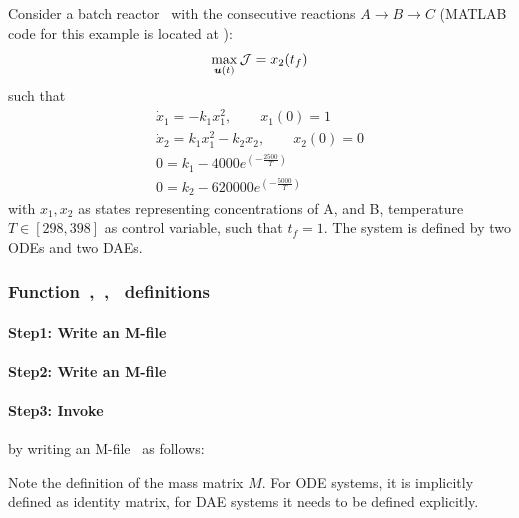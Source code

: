 Consider a batch reactor~\citep{raj01,dad95} with the 
consecutive reactions $A \rightarrow B\rightarrow C$ (MATLAB code for this example is located
at ):
\begin{equation}
\max_{\ve{u}(t)} \mf{J} = x_{2}(t_{f}) \label{eq:batch_dae}
\end{equation}
such that
\begin{gather}
\dot{x}_{1} = -k_{1}x_{1}^{2}, \qquad x_1(0) = 1 \\
\dot{x}_{2} = k_{1}x_{1}^{2} - k_{2}x_{2}, \qquad x_2(0) = 0 \\
0 = k_{1} - 4000e^{(-\frac{2500}{T})} \\
0 = k_{2} - 620000e^{(-\frac{5000}{T})} 
\end{gather} with $x_{1}, x_{2}$ as states representing concentrations
of A, and B, temperature $T \in [298,398]$ as control variable, such
that $t_{f} = 1$. The system is defined by two ODEs and two DAEs. 

\subsubsection{Function~,~,~  definitions}
\label{sec:example-fundef}

\paragraph{Step1: Write an M-file~}

{\small }

\paragraph{Step2: Write an M-file~}

{\small }

\paragraph{Step3: Invoke~} by writing an
M-file~ as follows:

{\small }

Note the definition of the mass matrix $M$. For ODE systems, it is
implicitly defined as identity matrix, for DAE systems it needs to be
defined explicitly. 

